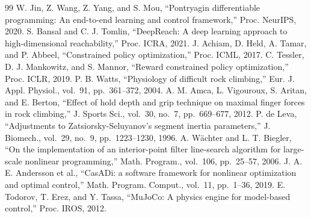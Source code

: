 \documentclass[MIRU,submit]{miru2025j}
\begin{document}
\begin{thebibliography}{99}
 W. Jin, Z. Wang, Z. Yang, and S. Mou, ``Pontryagin differentiable programming: An end-to-end learning and control framework,'' Proc. NeurIPS, 2020.
 S. Bansal and C. J. Tomlin, ``DeepReach: A deep learning approach to high-dimensional reachability,'' Proc. ICRA, 2021.
 J. Achiam, D. Held, A. Tamar, and P. Abbeel, ``Constrained policy optimization,'' Proc. ICML, 2017.
 C. Tessler, D. J. Mankowitz, and S. Mannor, ``Reward constrained policy optimization,'' Proc. ICLR, 2019.
 P. B. Watts, ``Physiology of difficult rock climbing,'' Eur. J. Appl. Physiol., vol.~91, pp.~361--372, 2004.
 A. M. Amca, L. Vigouroux, S. Aritan, and E. Berton, ``Effect of hold depth and grip technique on maximal finger forces in rock climbing,'' J. Sports Sci., vol.~30, no.~7, pp.~669--677, 2012.
 P. de Leva, ``Adjustments to Zatsiorsky-Seluyanov's segment inertia parameters,'' J. Biomech., vol.~29, no.~9, pp.~1223--1230, 1996.
 A. W\"achter and L. T. Biegler, ``On the implementation of an interior-point filter line-search algorithm for large-scale nonlinear programming,'' Math. Program., vol.~106, pp.~25--57, 2006.
 J. A. E. Andersson et al., ``CasADi: a software framework for nonlinear optimization and optimal control,'' Math. Program. Comput., vol.~11, pp.~1--36, 2019.
 E. Todorov, T. Erez, and Y. Tassa, ``MuJoCo: A physics engine for model-based control,'' Proc. IROS, 2012.
\end{thebibliography}
\end{document}
